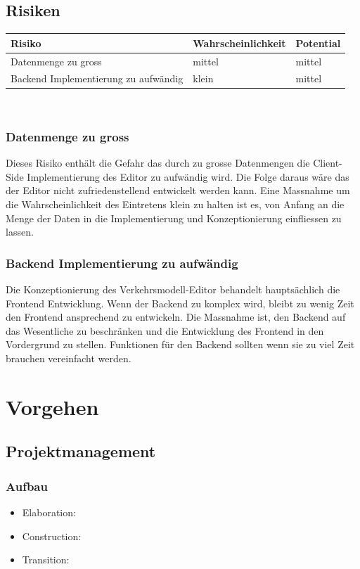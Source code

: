 \documentclass[10pt,a4paper]{article}
\begin{document}
\subsection{Risiken}
\begin{flushleft}
\begin{tabular}{l l l}
Risiko & Wahrscheinlichkeit & Potential\\
\hline
Datenmenge zu gross & mittel & mittel\\
Backend Implementierung zu aufwändig & klein & mittel\\
\end{tabular}\\[0.2cm]
\subsubsection*{Datenmenge zu gross}
Dieses Risiko enthält die Gefahr das durch zu grosse Datenmengen die Client-Side Implementierung des Editor zu aufwändig wird. Die Folge daraus wäre das der Editor nicht zufriedenstellend entwickelt werden kann. Eine Massnahme um die Wahrscheinlichkeit des Eintretens klein zu halten ist es, von Anfang an die Menge der Daten in die Implementierung und Konzeptionierung einfliessen zu lassen.\\[0.2cm]
\subsubsection*{Backend Implementierung zu aufwändig}
Die Konzeptionierung des Verkehrsmodell-Editor behandelt hauptsächlich die Frontend Entwicklung. Wenn der Backend zu komplex wird, bleibt zu wenig Zeit den Frontend ansprechend zu entwickeln. Die Massnahme ist, den Backend auf das Wesentliche zu beschränken und die Entwicklung des Frontend in den Vordergrund zu stellen. Funktionen für den Backend sollten wenn sie zu viel Zeit brauchen vereinfacht werden.\\

\end{flushleft}
\newpage
\section{Vorgehen}
\subsection{Projektmanagement}
\subsubsection{Aufbau}
\begin{itemize}
	\item Elaboration: 
	\item Construction: 
	\item Transition: 
\end{itemize}
\end{document}
